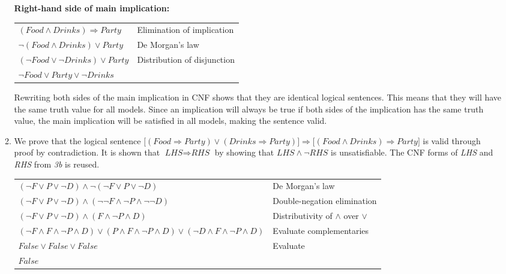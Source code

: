 \begin{enumerate}
\begin{enumerate}
\textbf{Right-hand side of main implication:}

\begin{tabular}{ll}
$(\textit{Food} \land \textit{Drinks}) \Rightarrow \textit{Party}$ & Elimination of implication\\
$\neg (\textit{Food} \land \textit{Drinks}) \lor \textit{Party}$ & De Morgan's law\\
$(\neg \textit{Food} \lor \neg \textit{Drinks}) \lor \textit{Party}$ & Distribution of disjunction\\
$\neg \textit{Food} \lor \textit{Party} \lor \neg \textit{Drinks}$ \\
\end{tabular}

Rewriting both sides of the main implication in \ac{CNF} shows that they are identical logical sentences. This means that they will have the same truth value for all models. Since an implication will always be true if both sides of the implication has the same truth value, the main implication will be satisfied in all models, making the sentence valid.

\item

We prove that the logical sentence $\big[(\textit{Food} \Rightarrow \textit{Party}) \lor (\textit{Drinks} \Rightarrow \textit{Party})\big] \Rightarrow \big[(\textit{Food} \land \textit{Drinks}) \Rightarrow \textit{Party}\big]$ is valid through proof by contradiction. It is shown that $\textit{LHS} \Rightarrow \textit{RHS}$ by showing that $\textit{LHS} \land \neg \textit{RHS}$ is unsatisfiable. The \ac{CNF} forms of \textit{LHS} and \textit{RHS} from \textit{3b} is reused.

\begin{tabular}{ll}
$(\neg \textit{F} \lor \textit{P} \lor \neg \textit{D}) \land \neg (\neg \textit{F} \lor \textit{P} \lor \neg \textit{D})$ & De Morgan's law \\
$(\neg \textit{F} \lor \textit{P} \lor \neg \textit{D}) \land (\neg \neg \textit{F} \land \neg \textit{P} \land \neg \neg \textit{D})$ & Double-negation elimination \\
$(\neg \textit{F} \lor \textit{P} \lor \neg \textit{D}) \land (\textit{F} \land \neg \textit{P} \land \textit{D})$ & Distributivity of $\land$ over $\lor$ \\
$(\neg \textit{F} \land \textit{F} \land \neg \textit{P} \land \textit{D}) \lor (\textit{P} \land \textit{F} \land \neg \textit{P} \land \textit{D}) \lor (\neg \textit{D} \land \textit{F} \land \neg \textit{P} \land \textit{D})$ & Evaluate complementaries \\
$\textit{False} \lor \textit{False} \lor \textit{False}$ & Evaluate \\
$\textit{False}$ & \\
\end{tabular}


\end{enumerate}
\end{enumerate}
